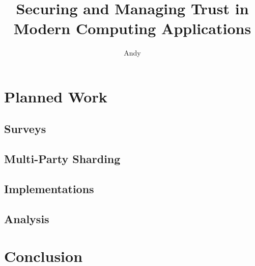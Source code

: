 \documentclass[defaultstyle,11pt]{thesis}
\title{Securing and Managing Trust in Modern Computing Applications}
\author{Andy}{Sayler}
\begin{document}










%



%
\chapter{Planned Work}
\label{chap:planned}

\section{Surveys}
\section{Multi-Party Sharding}
\section{Implementations}
\section{Analysis}

%
\chapter{Conclusion}
\label{chap:conclusion}


\nocite{*}                %

\appendix
%
%
\end{document}
